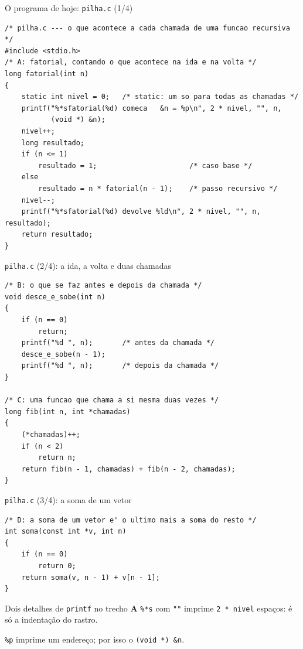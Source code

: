 \documentclass[aspectratio=169]{beamer}
\begin{document}
\begin{frame}[fragile]{O programa de hoje: \texttt{pilha.c} (1/4)}
\begin{lstlisting}[style=codC]
/* pilha.c --- o que acontece a cada chamada de uma funcao recursiva */
#include <stdio.h>
/* A: fatorial, contando o que acontece na ida e na volta */
long fatorial(int n)
{
    static int nivel = 0;   /* static: um so para todas as chamadas */
    printf("%*sfatorial(%d) comeca   &n = %p\n", 2 * nivel, "", n,
           (void *) &n);
    nivel++;
    long resultado;
    if (n <= 1)
        resultado = 1;                      /* caso base */
    else
        resultado = n * fatorial(n - 1);    /* passo recursivo */
    nivel--;
    printf("%*sfatorial(%d) devolve %ld\n", 2 * nivel, "", n, resultado);
    return resultado;
}
\end{lstlisting}
\end{frame}

\begin{frame}[fragile]{\texttt{pilha.c} (2/4): a ida, a volta e duas chamadas}
\begin{lstlisting}[style=codC]
/* B: o que se faz antes e depois da chamada */
void desce_e_sobe(int n)
{
    if (n == 0)
        return;
    printf("%d ", n);       /* antes da chamada */
    desce_e_sobe(n - 1);
    printf("%d ", n);       /* depois da chamada */
}

/* C: uma funcao que chama a si mesma duas vezes */
long fib(int n, int *chamadas)
{
    (*chamadas)++;
    if (n < 2)
        return n;
    return fib(n - 1, chamadas) + fib(n - 2, chamadas);
}
\end{lstlisting}
\end{frame}

\begin{frame}[fragile]{\texttt{pilha.c} (3/4): a soma de um vetor}
\begin{lstlisting}[style=codC]
/* D: a soma de um vetor e' o ultimo mais a soma do resto */
int soma(const int *v, int n)
{
    if (n == 0)
        return 0;
    return soma(v, n - 1) + v[n - 1];
}
\end{lstlisting}
  \begin{block}{Dois detalhes de \texttt{printf} no trecho \textbf{A}}
    \small
    \texttt{\%*s} com \texttt{""} imprime \texttt{2 * nivel} espaços: é só a
    indentação do rastro.

    \medskip
    \texttt{\%p} imprime um endereço; por isso o \texttt{(void *) \&n}.
  \end{block}
\end{frame}
\end{document}
